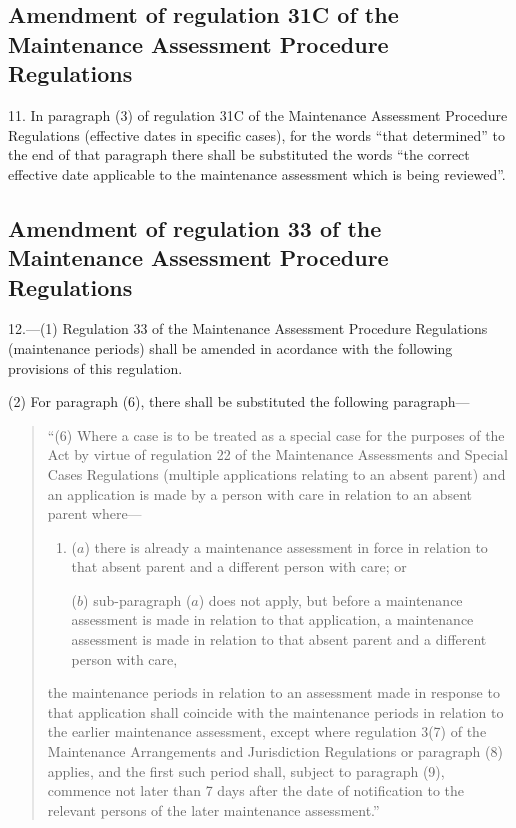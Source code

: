 \documentclass[12pt,a4paper]{article}
\begin{document}
\subsection[11. Amendment of regulation 31C of the Maintenance Assessment Procedure Regulations]{Amendment of regulation 31C of the Maintenance Assessment Procedure Regulations}

11.  In paragraph (3) of regulation 31C of the Maintenance Assessment Procedure Regulations (effective dates in specific cases), for the words “that determined” to the end of that paragraph there shall be substituted the words “the correct effective date applicable to the maintenance assessment which is being reviewed”.

\subsection[12. Amendment of regulation 33 of the Maintenance Assessment Procedure Regulations]{Amendment of regulation 33 of the Maintenance Assessment Procedure Regulations}

12.—(1) Regulation 33 of the Maintenance Assessment Procedure Regulations (maintenance periods) shall be amended in acordance with the following provisions of this regulation.

(2) For paragraph (6), there shall be substituted the following paragraph—
\begin{quotation}
“(6) Where a case is to be treated as a special case for the purposes of the Act by virtue of regulation 22 of the Maintenance Assessments and Special Cases Regulations (multiple applications relating to an absent parent) and an application is made by a person with care in relation to an absent parent where—
\begin{enumerate}\item[]
($a$) there is already a maintenance assessment in force in relation to that absent parent and a different person with care; or

($b$) sub-paragraph ($a$) does not apply, but before a maintenance assessment is made in relation to that application, a maintenance assessment is made in relation to that absent parent and a different person with care,
\end{enumerate}
the maintenance periods in relation to an assessment made in response to that application shall coincide with the maintenance periods in relation to the earlier maintenance assessment, except where regulation 3(7) of the Maintenance Arrangements and Jurisdiction Regulations or paragraph (8) applies, and the first such period shall, subject to paragraph (9), commence not later than 7 days after the date of notification to the relevant persons of the later maintenance assessment.”
\end{quotation}
\end{document}
